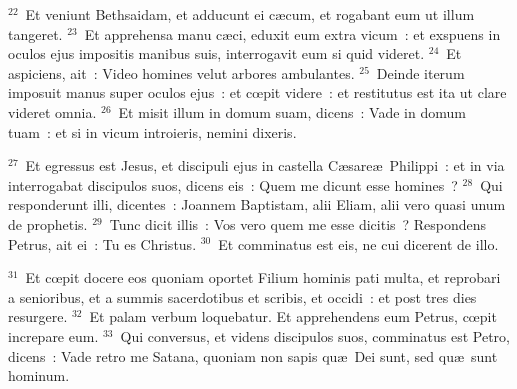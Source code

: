 ${}^{22}$~Et veniunt Bethsaidam, et adducunt ei c\ae cum, et rogabant eum ut illum tangeret.
${}^{23}$~Et apprehensa manu c\ae ci, eduxit eum extra vicum~: et exspuens in oculos ejus impositis manibus suis, interrogavit eum si quid videret.
${}^{24}$~Et aspiciens, ait~: Video homines velut arbores ambulantes.
${}^{25}$~Deinde iterum imposuit manus super oculos ejus~: et cœpit videre~: et restitutus est ita ut clare videret omnia.
${}^{26}$~Et misit illum in domum suam, dicens~: Vade in domum tuam~: et si in vicum introieris, nemini dixeris.


${}^{27}$~Et egressus est Jesus, et discipuli ejus in castella C\ae sare\ae\ Philippi~: et in via interrogabat discipulos suos, dicens eis~: Quem me dicunt esse homines~?
${}^{28}$~Qui responderunt illi, dicentes~: Joannem Baptistam, alii Eliam, alii vero quasi unum de prophetis.
${}^{29}$~Tunc dicit illis~: Vos vero quem me esse dicitis~? Respondens Petrus, ait ei~: Tu es Christus.
${}^{30}$~Et comminatus est eis, ne cui dicerent de illo.


${}^{31}$~Et cœpit docere eos quoniam oportet Filium hominis pati multa, et reprobari a senioribus, et a summis sacerdotibus et scribis, et occidi~: et post tres dies resurgere.
${}^{32}$~Et palam verbum loquebatur. Et apprehendens eum Petrus, cœpit increpare eum.
${}^{33}$~Qui conversus, et videns discipulos suos, comminatus est Petro, dicens~: Vade retro me Satana, quoniam non sapis qu\ae\ Dei sunt, sed qu\ae\ sunt hominum.


